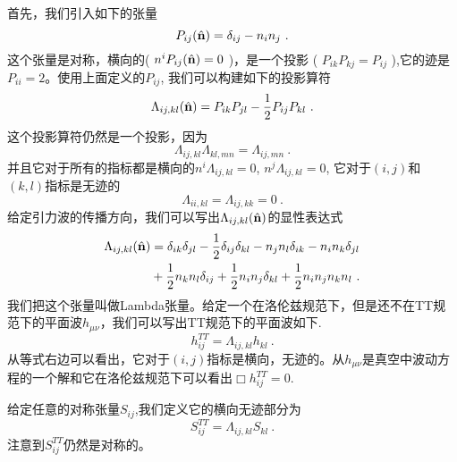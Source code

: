 首先，我们引入如下的张量
\begin{equation}
P_{ij} (\hat{\bf{n}} ) = \delta_{ij} - n_in_j~.
\end{equation}
这个张量是对称，横向的( $ n^iP_{ij}(\hat{\bf{n}}) = 0 $ )，是一个投影 ( $ P_{ik} P_{kj} = P_{ij} $ ),它的迹是$P_{ii} = 2$。使用上面定义的$P_{ij}$, 我们可以构建如下的投影算符
\begin{equation}
\Lambda_{ij,kl} ( \hat{\bf{n}} )  = P_{ik} P_{jl} - \frac{1}{2} P_{ij} P_{kl} ~. 
\end{equation}
这个投影算符仍然是一个投影，因为
\begin{equation}
\Lambda_{ij,kl} \Lambda_{kl,mn} = \Lambda_{ij,mn} ~. 
\end{equation}
并且它对于所有的指标都是横向的$ n^i \Lambda_{ij,kl} = 0 $, $ n^j \Lambda_{ij,kl} = 0 $, 它对于$(i,j)$和$(k,l)$指标是无迹的
\begin{equation}
\Lambda_{ii,kl} = \Lambda_{ij,kk} = 0 ~. 
\end{equation}
给定引力波的传播方向，我们可以写出$\Lambda_{ij,kl} (\hat{ {\bf n} })$的显性表达式
\begin{equation}
\begin{aligned}
\Lambda_{ij,kl} (\hat{ {\bf n} }   ) & = \delta_{ik} \delta_{jl} - \frac{1}{2} \delta_{ij} \delta_{kl} - n_j n_l \delta_{ik} - n_i n_k \delta_{jl} \\
& + \frac{1}{2} n_k n_l \delta_{ij} + \frac{1}{2} n_i n_j \delta_{kl} + \frac{1}{2} n_i n_j n_k n_l ~.
\end{aligned}
\end{equation}
我们把这个张量叫做Lambda张量。给定一个在洛伦兹规范下，但是还不在TT规范下的平面波$h_{\mu\nu}$，我们可以写出TT规范下的平面波如下.
\begin{equation}
h_{ij}^{TT} = \Lambda_{ij,kl} h_{kl} ~.
\end{equation}
从等式右边可以看出，它对于$(i,j)$指标是横向，无迹的。从$h_{\mu\nu}$是真空中波动方程的一个解和它在洛伦兹规范下可以看出$\Box h_{ij}^{TT} = 0$. 

给定任意的对称张量$S_{ij}$,我们定义它的横向无迹部分为
\begin{equation}
S^{TT}_{ij} = \Lambda_{ij,kl} S_{kl} ~.
\end{equation}
注意到$S^{TT}_{ij}$仍然是对称的。

